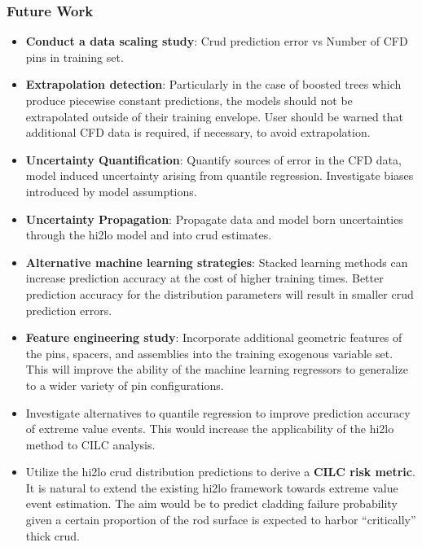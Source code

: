\documentclass[t, pdftex]{beamer}
\begin{document}
\begin{frame}[shrink=10]
\frametitle{Future Work}
\vspace{-16pt}
\scriptsize{
\begin{itemize}
    \item \textbf{Conduct a data scaling study}:  Crud prediction error vs Number of CFD pins in training set.
    \item \textbf{Extrapolation detection}:  Particularly in the case of boosted trees which produce piecewise constant predictions, the models should not be extrapolated outside of their training envelope.  User should be warned that additional CFD data is required, if necessary, to avoid extrapolation.
    \item \textbf{Uncertainty Quantification}:  Quantify sources of error in the CFD data, model induced uncertainty arising from quantile regression.  Investigate biases introduced by model assumptions.
    \item \textbf{Uncertainty Propagation}:  Propagate data and model born uncertainties through the hi2lo model and into crud estimates.
    \item\textbf{Alternative machine learning strategies}:  Stacked learning methods can increase prediction accuracy at the cost of higher training times.  Better prediction accuracy for the distribution parameters will result in smaller crud prediction errors.
    \item \textbf{Feature engineering study}:  Incorporate additional geometric features of the pins, spacers, and assemblies into the training exogenous variable set.  This will improve the ability of the machine learning regressors to generalize to a wider variety of pin configurations.
    \item Investigate alternatives to quantile regression to improve prediction accuracy of extreme value events.  This would increase the applicability of the hi2lo method to CILC analysis.
    \item Utilize the hi2lo crud distribution predictions to derive a \textbf{CILC risk metric}.  It is natural to extend the existing hi2lo framework towards extreme value event estimation.  The aim would be to predict cladding failure probability given a certain proportion of the rod surface is expected to harbor ``critically'' thick crud.
\end{itemize}
}
\end{frame}
\end{document}
